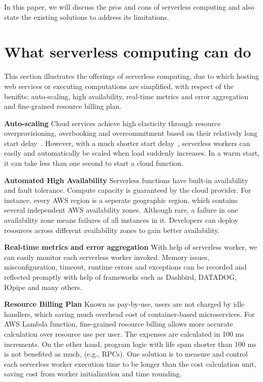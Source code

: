 \documentclass{kcc}
\begin{document}
In this paper, we will discuss the pros and cons of serverless computing and also state the existing solutions to address its limitations.

\section{What serverless computing can do}

This section illustrates the offerings of serverless computing, due to which hosting web services or executing computations are simplified, with respect of the benifits: auto-scaling, high availability, real-time metrics and error aggregation and fine-grained resource billing plan.

\textbf{Auto-scaling} Cloud services achieve high elasticity through resource overprovisioning, overbooking and overcommitment based on their relatively long start delay~\cite{openLambda:2}. However, with a much shorter start delay~\cite{Sprocket:3}, serverless workers can easily and automatically be scaled when load suddenly increases. In a warm start, it can take less than one second to start a cloud function.~\cite{Kubernetes:16}

\textbf{Automated High Availability} Serverless functions have built-in availability and fault tolerance. Compute capacity is guaranteed by the cloud provider. For instance, every AWS region is a seperate geographic region, which contains several independent AWS availability zones. Although rare, a failure in one availability zone means failures of all instances in it. Developers can deploy resources across different availability zones to gain better availability.

\textbf{Real-time metrics and error aggregation} With help of serverless worker, we can easily monitor each serverless worker invoked. Memory issues, misconfiguration, timeout, runtime errors and exceptions can be recorded and reflected promptly with help of frameworks such as Dashbird, DATADOG, IOpipe and many others.

\textbf{Resource Billing Plan} Known as pay-by-use, users are not charged by idle handlers, which saving much overhead cost of container-based microservices. For AWS Lambda function, fine-grained resource billing allows more accurate calculation over resource use per user. The expenses are calculated in 100 ms increments. On the other hand, program logic with life span shorter than 100 ms is not benefited as much, (e.g., RPCs). One solution is to measure and control each serverless worker execution time to be longer than the cost calculation unit, saving cost from worker initialization and time rounding. 
\end{document}
